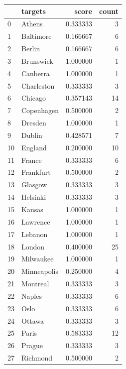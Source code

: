 \begin{parts}
{        \begin{tabular}{llrr}
                \toprule
                 & targets & score & count \\
                \midrule
                0 & Athens & 0.333333 & 3 \\
                1 & Baltimore & 0.166667 & 6 \\
                2 & Berlin & 0.166667 & 6 \\
                3 & Brunswick & 1.000000 & 1 \\
                4 & Canberra & 1.000000 & 1 \\
                5 & Charleston & 0.333333 & 3 \\
                6 & Chicago & 0.357143 & 14 \\
                7 & Copenhagen & 0.500000 & 2 \\
                8 & Dresden & 1.000000 & 1 \\
                9 & Dublin & 0.428571 & 7 \\
                10 & England & 0.200000 & 10 \\
                11 & France & 0.333333 & 6 \\
                12 & Frankfurt & 0.500000 & 2 \\
                13 & Glasgow & 0.333333 & 3 \\
                14 & Helsinki & 0.333333 & 3 \\
                15 & Kansas & 1.000000 & 1 \\
                16 & Lawrence & 1.000000 & 1 \\
                17 & Lebanon & 1.000000 & 1 \\
                18 & London & 0.400000 & 25 \\
                19 & Milwaukee & 1.000000 & 1 \\
                20 & Minneapolis & 0.250000 & 4 \\
                21 & Montreal & 0.333333 & 3 \\
                22 & Naples & 0.333333 & 6 \\
                23 & Oslo & 0.333333 & 6 \\
                24 & Ottawa & 0.333333 & 3 \\
                25 & Paris & 0.583333 & 12 \\
                26 & Prague & 0.333333 & 3 \\
                27 & Richmond & 0.500000 & 2 \\

\end{tabular}}
\end{parts}

